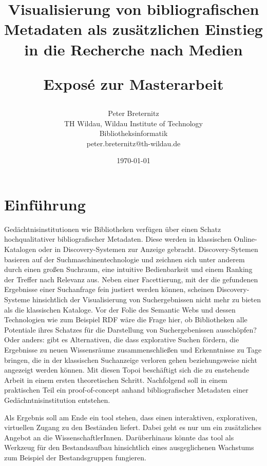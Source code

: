\documentclass[10pt,a4paper,twocolumn,conference]{IEEEtran}
\begin{document}
\nocite{*}
\title{{\bf Visualisierung von bibliografischen Metadaten als zusätzlichen Einstieg in die
        Recherche nach Medien } \\ 
    \begin{large}
        Exposé zur Masterarbeit                                                                             
    \end{large}}
\author{
	Peter Breternitz \\
	TH Wildau, Wildau Institute of Technology\\ Bibliotheksinformatik \\
	peter.breternitz@th-wildau.de
}


\date{\today}

\maketitle

\section{Einführung}
Gedächtnisinstitutionen wie Bibliotheken verfügen über einen Schatz 
hochqualitativer bibliografischer Metadaten. Diese werden in klassischen 
Online-Katalogen oder in Discovery-Systemen zur Anzeige gebracht. 
Discovery-Sytemen basieren auf der Suchmaschinentechnologie und zeichnen sich 
unter anderem durch einen großen Suchraum, eine intuitive Bedienbarkeit und
einem Ranking der Treffer nach Relevanz aus. Neben einer Facettierung, 
mit der die gefundenen Ergebnisse einer Suchanfrage fein justiert werden 
können, scheinen Discovery-Systeme hinsichtlich der Visualisierung von Suchergebnissen 
nicht mehr zu bieten als die klassischen Kataloge. Vor der Folie
des Semantic Webs und dessen Technologien wie zum Beispiel RDF wäre die Frage
hier, ob Bibliotheken alle Potentiale ihres Schatzes für die Darstellung von
Suchergebenissen ausschöpfen? Oder anders: gibt es Alternativen, die dass 
explorative Suchen fördern, die Ergebnisse zu neuen Wissensräume zusammenschließen 
und Erkenntnisse zu Tage bringen, die in der klassischen Suchanzeige verloren
gehen beziehungsweise nicht angezeigt werden können. Mit diesen Topoi
beschäftigt sich die zu enstehende Arbeit in einem ersten theoretischen Schritt.
Nachfolgend soll in einem praktischen Teil  ein proof-of-concept anhand 
bibliografischer Metadaten einer Gedächntnisinstitution entstehen.

Als Ergebnis soll am Ende ein tool stehen, dass einen interaktiven, explorativen, virtuellen
Zugang zu den Beständen liefert. Dabei geht es nur um ein zusätzliches Angebot an
die WissenschaftlerInnen. Darüberhinaus könnte das tool als Werkzeug für den
Bestandsaufbau hinsichtlich  eines ausgeglichenen Wachstums zum
Beispiel der Bestandsgruppen fungieren. 
\end{document}
